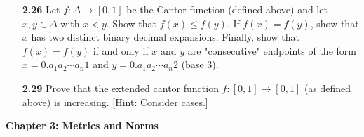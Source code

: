 \documentclass[12pt]{amsart}
\begin{document}
\begin{enumerate}
\item[\bf 2.26] Let $f:\Delta\to [0,1]$ be the Cantor function (defined above) and let $x, y\in\Delta$ with $x<y$. Show that $f(x)\leq f(y)$. If $f(x)=f(y)$, show that $x$ has two distinct binary decimal expansions. Finally, show that $f(x)=f(y)$ if and only if $x$ and $y$ are "consecutive" endpoints of the form $x=0.a_1a_2\cdots a_n1$ and $y=0.a_1a_2\cdots a_n 2$ (base 3).

\bigskip

\item[\bf 2.29] Prove that the extended cantor function $f:[0,1]\to [0,1]$ (as defined above) is increasing. [Hint: Consider cases.]

\bigskip

\end{enumerate}

{\bf Chapter 3: Metrics and Norms}
\end{document}
